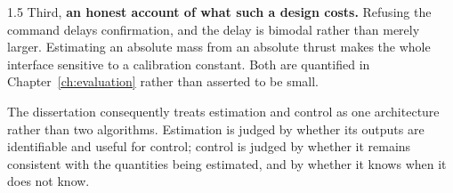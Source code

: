 \begin{spacing}{1.5}
Third, \textbf{an honest account of what such a design costs.} Refusing the
command delays confirmation, and the delay is bimodal rather than merely larger.
Estimating an absolute mass from an absolute thrust makes the whole interface
sensitive to a calibration constant. Both are quantified in
Chapter~\ref{ch:evaluation} rather than asserted to be small.

The dissertation consequently treats estimation and control as one architecture
rather than two algorithms. Estimation is judged by whether its outputs are
identifiable and useful for control; control is judged by whether it remains
consistent with the quantities being estimated, and by whether it knows when it
does not know.

\end{spacing}
\newpage
